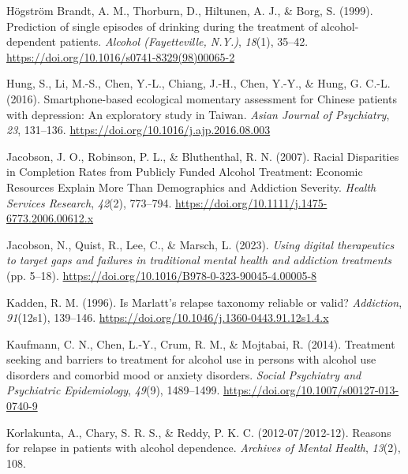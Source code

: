 \documentclass[
  letterpaper,
  DIV=11,
  numbers=noendperiod]{scrartcl}
\newlength{\cslhangindent}
\newenvironment{CSLReferences}[2] %
 {\begin{list}{}{%
  \setlength{\itemindent}{0pt}
  \setlength{\leftmargin}{0pt}
  \setlength{\parsep}{0pt}
  \ifodd #1
   \setlength{\leftmargin}{\cslhangindent}
   \setlength{\itemindent}{-1\cslhangindent}
  \fi
  \setlength{\itemsep}{#2\baselineskip}}}
 {\end{list}}
\begin{document}
\begin{CSLReferences}{1}{0}
Högström Brandt, A. M., Thorburn, D., Hiltunen, A. J., \& Borg, S.
(1999). Prediction of single episodes of drinking during the treatment
of alcohol-dependent patients. \emph{Alcohol (Fayetteville, N.Y.)},
\emph{18}(1), 35--42.
\url{https://doi.org/10.1016/s0741-8329(98)00065-2}

Hung, S., Li, M.-S., Chen, Y.-L., Chiang, J.-H., Chen, Y.-Y., \& Hung,
G. C.-L. (2016). Smartphone-based ecological momentary assessment for
{Chinese} patients with depression: {An} exploratory study in {Taiwan}.
\emph{Asian Journal of Psychiatry}, \emph{23}, 131--136.
\url{https://doi.org/10.1016/j.ajp.2016.08.003}

Jacobson, J. O., Robinson, P. L., \& Bluthenthal, R. N. (2007). Racial
{Disparities} in {Completion Rates} from {Publicly Funded Alcohol
Treatment}: {Economic Resources Explain More Than Demographics} and
{Addiction Severity}. \emph{Health Services Research}, \emph{42}(2),
773--794. \url{https://doi.org/10.1111/j.1475-6773.2006.00612.x}

Jacobson, N., Quist, R., Lee, C., \& Marsch, L. (2023). \emph{Using
digital therapeutics to target gaps and failures in traditional mental
health and addiction treatments} (pp. 5--18).
\url{https://doi.org/10.1016/B978-0-323-90045-4.00005-8}

Kadden, R. M. (1996). Is {Marlatt}'s relapse taxonomy reliable or valid?
\emph{Addiction}, \emph{91}(12s1), 139--146.
\url{https://doi.org/10.1046/j.1360-0443.91.12s1.4.x}

Kaufmann, C. N., Chen, L.-Y., Crum, R. M., \& Mojtabai, R. (2014).
Treatment seeking and barriers to treatment for alcohol use in persons
with alcohol use disorders and comorbid mood or anxiety disorders.
\emph{Social Psychiatry and Psychiatric Epidemiology}, \emph{49}(9),
1489--1499. \url{https://doi.org/10.1007/s00127-013-0740-9}

Korlakunta, A., Chary, S. R. S., \& Reddy, P. K. C. (2012-07/2012-12).
Reasons for relapse in patients with alcohol dependence. \emph{Archives
of Mental Health}, \emph{13}(2), 108.


\end{CSLReferences}
\end{document}
